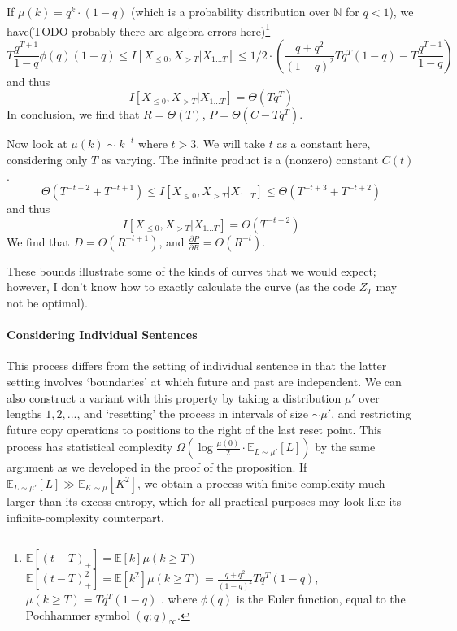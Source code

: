 \documentclass[11pt,letterpaper]{article}
\newcommand{\E}[0]{\mathbb{E}}
\begin{document}
If $\mu(k) = q^{k} \cdot (1-q)$ (which is a probability distribution over $\mathbb{N}$ for $q < 1$), we have(TODO probably there are algebra errors here)\footnote{$\E \left[(t-T)_+ \right] = \E[k] \mu(k\geq T)$
$\E \left[(t-T)_+^2 \right] = \E[k^2] \mu(k\geq T) = \frac{q+q^2}{(1-q)^2} T q^T (1-q)$, 
$\mu(k\geq T) = T q^T (1-q)$
. where $\phi(q)$ is the Euler function, equal to the Pochhammer symbol $(q;q)_\infty$.}
\begin{equation}
T \frac{q^{T+1}}{1-q}  \phi(q) (1-q) \leq I[X_{\leq 0}, X_{>T}|X_{1\dots T}] \leq 1/2 \cdot (\frac{q+q^2}{(1-q)^2} T q^T (1-q) - T \frac{q^{T+1}}{1-q} )
\end{equation}
and thus
\begin{equation}
I[X_{\leq 0}, X_{>T}|X_{1\dots T}] = \Theta(T q^T)
\end{equation}
In conclusion, we find that $R = \Theta(T)$, $P = \Theta(C-T q^T)$.

Now look at $\mu(k) \sim k^{-t}$ where $t > 3$.
We will take $t$ as a constant here, considering only $T$ as varying.
The infinite product is a (nonzero) constant $C(t)$.
\begin{equation}
\Theta(T^{-t+2} + T^{-t+1}) \leq I[X_{\leq 0}, X_{>T}|X_{1\dots T}] \leq \Theta(T^{-t+3} + T^{-t+2})
\end{equation}
and thus
\begin{equation}
I[X_{\leq 0}, X_{>T}|X_{1\dots T}] = \Theta(T^{-t+2})
\end{equation}
We find that $D = \Theta(R^{-t+1})$, and $\frac{\partial P}{\partial R} = \Theta( R^{-t})$.



These bounds illustrate some of the kinds of curves that we would expect; however, I don't know how to exactly calculate the curve (as the code $Z_T$ may not be optimal).


\paragraph{Considering Individual Sentences}
This process differs from the setting of individual sentence in that the latter setting involves `boundaries' at which future and past are independent.
We can also construct a variant with this property by taking a distribution $\mu'$ over lengths $1,2,...$, and `resetting' the process in intervals of size $\sim \mu'$, and restricting future copy operations to positions to the right of the last reset point.
This process has statistical complexity %
$\Omega\left(\log \frac{\mu(0)}{2} \cdot \E_{L \sim \mu'}[L]\right)$ by the same argument as we developed in the proof of the proposition.
If $\E_{L \sim \mu'}[L] \gg \E_{K \sim \mu}[K^2]$, we obtain a process with finite complexity much larger than its excess entropy, which for all practical purposes may look like its infinite-complexity counterpart.
\end{document}
